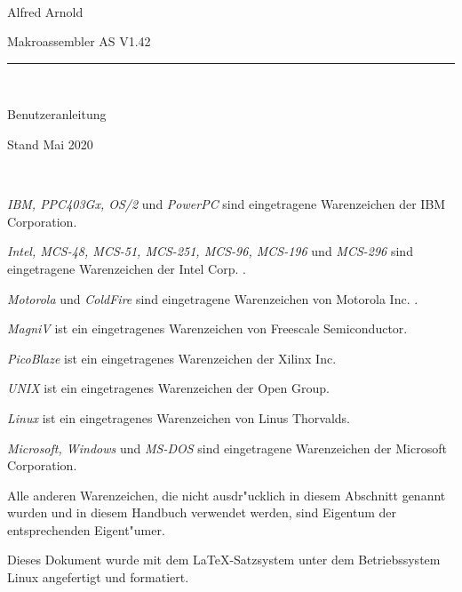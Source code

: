 \documentclass[12pt,a4paper,twoside]{report}
\begin{document}
\thispagestyle{empty}

\
\vspace{7cm}\par

\begin{raggedright}
{\large Alfred Arnold}\\
\vspace{1cm}\par
{\huge Makroassembler AS V1.42}\\
\rule{9.5cm}{0.3mm}\\
\vspace{2mm}\par
{\huge Benutzeranleitung}

\vspace{1cm}\par

{\large Stand Mai 2020}
\end{raggedright}

\clearpage
\thispagestyle{empty}

\ \vspace{4cm}

{\em IBM, PPC403Gx, OS/2} und {\em PowerPC} sind eingetragene Warenzeichen
der IBM Corporation.

{\em Intel, MCS-48, MCS-51, MCS-251, MCS-96, MCS-196} und {\em MCS-296}
sind eingetragene Warenzeichen der Intel Corp. .

{\em Motorola} und {\em ColdFire} sind eingetragene Warenzeichen von
Motorola Inc. .

{\em MagniV} ist ein eingetragenes Warenzeichen von Freescale Semiconductor.

{\em PicoBlaze} ist ein eingetragenes Warenzeichen der Xilinx Inc.

{\em UNIX} ist ein eingetragenes Warenzeichen der Open Group.

{\em Linux} ist ein eingetragenes Warenzeichen von Linus Thorvalds.

{\em Microsoft, Windows} und {\em MS-DOS} sind eingetragene Warenzeichen
der Microsoft Corporation.

Alle anderen Warenzeichen, die nicht ausdr"ucklich in diesem Abschnitt
genannt wurden und in diesem Handbuch verwendet werden, sind Eigentum
der entsprechenden Eigent"umer.

\vspace{6cm}

Dieses Dokument wurde mit dem LaTeX-Satzsystem unter dem Betriebssystem
Linux angefertigt und formatiert.
\end{document}

